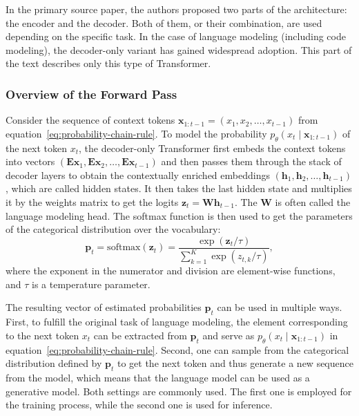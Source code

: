 In the primary source paper, the authors proposed two parts of the architecture: the encoder and the decoder. Both of them, or their combination, are used depending on the specific task. In the case of language modeling (including code modeling), the decoder-only variant has gained widespread adoption. This part of the text describes only this type of Transformer.

\subsubsection*{Overview of the Forward Pass}

Consider the sequence of context tokens \(\bm{x}_{1:t-1} = (x_1, x_2, \ldots, x_{t-1})\) from equation~\ref{eq:probability-chain-rule}. To model the probability \(p_{\theta}(x_t \mid \bm{x}_{1:t-1})\) of the next token \(x_t\), the decoder-only Transformer first embeds the context tokens into vectors \((\mathbf{Ex}_1, \mathbf{Ex}_2, \ldots, \mathbf{Ex}_{t-1})\) and then passes them through the stack of decoder layers to obtain the contextually enriched embeddings \((\mathbf{h}_1, \mathbf{h}_2, \ldots, \mathbf{h}_{t-1})\), which are called hidden states. It then takes the last hidden state and multiplies it by the weights matrix to get the logits \(\mathbf{z}_t = \mathbf{Wh}_{t-1}\). The \(\mathbf{W}\) is often called the language modeling head. The softmax function is then used to get the parameters of the categorical distribution over the vocabulary:
\begin{equation}
    \mathbf{p}_t = \mathrm{softmax}(\mathbf{z}_t) = \frac{\exp(\mathbf{z}_t / \tau)}{\sum_{k=1}^{K} \exp(z_{t,k} / \tau)},
\end{equation}
where the exponent in the numerator and division are element-wise functions, and \(\tau\) is a temperature parameter.  %

The resulting vector of estimated probabilities \(\mathbf{p}_t\) can be used in multiple ways. First, to fulfill the original task of language modeling, the element corresponding to the next token \(x_t\) can be extracted from \(\mathbf{p}_t\) and serve as \(p_{\theta}(x_t \mid \bm{x}_{1:t-1})\) in equation~\ref{eq:probability-chain-rule}. Second, one can sample from the categorical distribution defined by \(\mathbf{p}_t\) to get the next token and thus generate a new sequence from the model, which means that the language model can be used as a generative model. Both settings are commonly used. The first one is employed for the training process, while the second one is used for inference.

